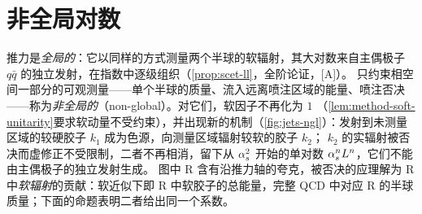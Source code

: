 \section{非全局对数}\label{sec:jets-ngl}

推力是\emph{全局的}：它以同样的方式测量两个半球的软辐射，其大对数来自主偶极子 $q\bar q$ 的独立发射，在指数中逐级组织（\cref{prop:scet-ll}，全阶论证，[A]）。
只约束相空间一部分的可观测量——单个半球的质量、流入远离喷注区域的能量、喷注否决——称为\emph{非全局的}（non-global）。对它们，软因子不再化为 $1$
（\cref{lem:method-soft-unitarity}要求软动量不受约束），并出现新的机制（\cref{fig:jets-ngl}）：发射到未测量区域的较硬胶子 $k_1$ 成为色源，向测量区域辐射较软的胶子 $k_2$；
$k_2$ 的实辐射被否决而虚修正不受限制，二者不再相消，留下从 $\alpha_s^2$ 开始的单对数 $\alpha_s^nL^n$，它们不能由主偶极子的独立发射生成\cite{DasguptaSalam2001}。
图中 R 含有沿推力轴的夸克，被否决的应理解为 R 中\emph{软辐射}的贡献：软近似下即 R 中软胶子的总能量，完整 QCD 中对应 R 的半球质量；下面的命题表明二者给出同一个系数。

